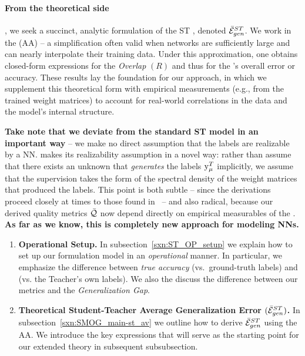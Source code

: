 \paragraph{From the theoretical side}, we seek a succinct, analytic formulation of the ST \AverageGeneralizationError, denoted $\bar{\mathcal{E}}^{ST}_{gen}$.  
We work in the \AnnealedApproximation (AA) -- a simplification often valid when networks are sufficiently large and can nearly interpolate their training data. 
Under this approximation, one obtains closed-form expressions for the \StudentTeacher \emph{Overlap} $(R)$
and thus for the \Teacher’s overall error or accuracy.  
These results lay the foundation for our \emph{\SemiEmpirical} approach, in which we supplement this theoretical form with empirical measurements (e.g., from the trained weight matrices) to account for real-world correlations in the data and the model’s internal structure.  

\textbf{Take note that we deviate from the standard \SMOG ST model in an important way} -- we make no direct assumption that the labels are realizable by a \Teacher NN. \SETOL makes its realizability assumption in a novel way: rather than assume that there exists an unknown \Teacher that \emph{generates} the labels $\mathrm{y}_{\mu}^{T}$ implicitly, we assume that the supervision takes the form of the spectral density of the weight matrices that produced the labels.
This point is both subtle -- since the derivations  proceed closely at times to those found in~\cite{engel2001statistical,EngelAndVanDenBroeck,SST90,SST92}
-- and also radical, because our derived quality metrics $\bar{\mathcal{Q}}$ now
depend directly on empirical measurables of the \Teacher.
\textbf{As far as we know, this is completely new \SemiEmpirical approach for modeling NNs.}


\begin{enumerate}[label=4.3.\arabic*]
\item
  \textbf{Operational Setup.}
  In subsection~\ref{sxn:ST_OP_setup} we explain how to set up our formulation\StudentTeacher
  model in an \emph{operational} manner. 
  In particular, we emphasize the difference between \emph{true accuracy} (vs.\ ground-truth labels)
  and \Precision (vs. the Teacher’s own labels). We also the discuss the difference between
  our \Quality metrics and the \emph{Generalization Gap}.

  \item
    \textbf{Theoretical Student-Teacher Average Generalization Error $(\bar{\mathcal{E}}^{ST}_{gen})$.}
    In subsection~\ref{sxn:SMOG_main-st_av}  we outline how to derive $\bar{\mathcal{E}}^{ST}_{gen}$ using the AA.  
    We introduce the key expressions that will serve as the starting point for our extended \SemiEmpirical theory in subsequent subsubsection.
\end{enumerate}



\clearpage
